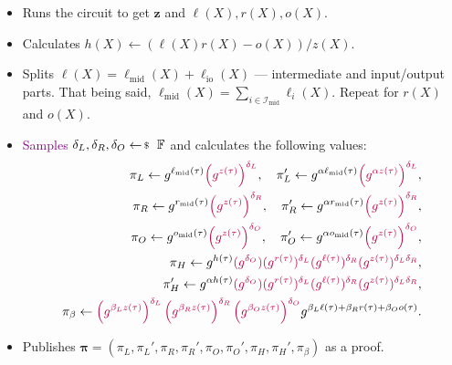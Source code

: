 \documentclass[../lecture-notes-148x210.tex]{subfiles}
\begin{document}
\begin{tcolorbox}
\begin{itemize}[label=]
        \item Runs the circuit to get $\mathbf{z}$ and $\ell(X),r(X),o(X)$.
        \item Calculates $h(X) \gets (\ell(X)r(X) - o(X))\big/ z(X)$.
        \item Splits $\ell(X) = \ell_{\text{mid}}(X) + \ell_{\text{io}}(X)$ --- intermediate and input/output parts. That being said, $\ell_{\text{mid}}(X) = \sum_{i \in \mathcal{I}_{\text{mid}}}\ell_i(X)$. Repeat for $r(X)$ and $o(X)$.
        \item \textcolor{purple}{Samples $\delta_L, \delta_R, \delta_O \leftarrowS \mathbb{F}$} and calculates the following values: 
        \begin{align*}
            \pi_L \gets g^{\ell_{\text{mid}}(\tau)}\textcolor{purple}{\left(g^{z(\tau)}\right)^{\delta_L}}, \quad \pi_L' \gets g^{\alpha \ell_{\text{mid}}(\tau)}\textcolor{purple}{\left(g^{\alpha z(\tau)}\right)^{\delta_L}}, \\
            \pi_R \gets g^{r_{\text{mid}}(\tau)}\textcolor{purple}{\left(g^{z(\tau)}\right)^{\delta_R}}, \quad \pi_R' \gets g^{\alpha r_{\text{mid}}(\tau)}\textcolor{purple}{\left(g^{z(\tau)}\right)^{\delta_R}}, \\
            \pi_O \gets g^{o_{\text{mid}}(\tau)}\textcolor{purple}{\left(g^{z(\tau)}\right)^{\delta_O}}, \quad \pi_O' \gets g^{\alpha o_{\text{mid}}(\tau)}\textcolor{purple}{\left(g^{z(\tau)}\right)^{\delta_O}}, \\
            \pi_H \gets g^{h(\tau)}\textcolor{purple}{(g^{\delta_O})(g^{r(\tau)})^{\delta_L}(g^{\ell(\tau)})^{\delta_R}(g^{z(\tau)})^{\delta_L\delta_R}}, \\ 
            \pi_H' \gets g^{\alpha h(\tau)}\textcolor{purple}{(g^{\delta_O})(g^{r(\tau)})^{\delta_L}(g^{\ell(\tau)})^{\delta_R}(g^{z(\tau)})^{\delta_L\delta_R}}, \\
            \pi_{\beta} \gets \textcolor{purple}{\left(g^{\beta_L z(\tau)}\right)^{\delta_L}\left(g^{\beta_R z(\tau)}\right)^{\delta_R}\left(g^{\beta_O z(\tau)}\right)^{\delta_O}}g^{\beta_L\ell(\tau) + \beta_Rr(\tau) + \beta_Oo(\tau)}.
        \end{align*}
        \item Publishes $\boldsymbol{\pi} = (\pi_L,\pi_L',\pi_R,\pi_R',\pi_O,\pi_O',\pi_H,\pi_H',\pi_{\beta})$ as a proof.
    \end{itemize}


\end{tcolorbox}
\end{document}
